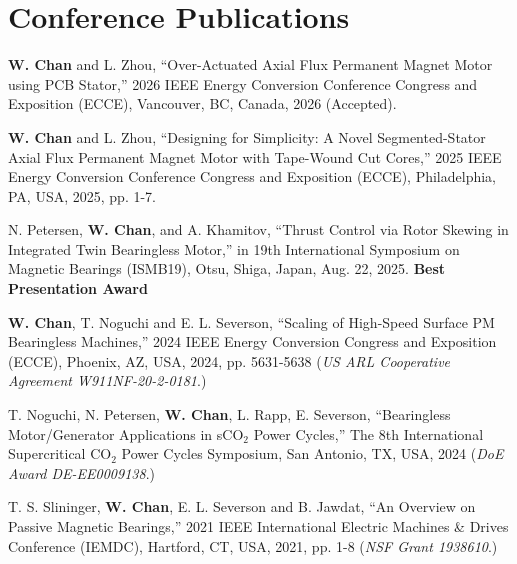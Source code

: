 \section{\sc Conference Publications}

\begin{description}[font=\normalfont, labelwidth=1.5em, leftmargin=2em, itemsep=0.5em]

\item[C6] \textbf{W. Chan} and L. Zhou, ``Over-Actuated Axial Flux Permanent Magnet
Motor using PCB Stator,'' 2026 IEEE Energy Conversion Conference Congress and Exposition (ECCE), Vancouver, BC, Canada, 2026 (Accepted).

\item[C5] \textbf{W. Chan} and L. Zhou, ``Designing for Simplicity: A Novel Segmented-Stator Axial Flux Permanent Magnet Motor with Tape-Wound Cut Cores,'' 2025 IEEE Energy Conversion Conference Congress and Exposition (ECCE), Philadelphia, PA, USA, 2025, pp. 1-7.

\item[C4] N. Petersen, \textbf{W. Chan}, and A. Khamitov, ``Thrust Control via Rotor Skewing in Integrated Twin Bearingless Motor,'' in 19th International Symposium on Magnetic Bearings (ISMB19), Otsu, Shiga, Japan, Aug. 22, 2025. {\color{maroon} \textbf{Best Presentation Award}} 

\item[C3] \textbf{W. Chan}, T. Noguchi and E. L. Severson, ``Scaling of High-Speed Surface PM Bearingless Machines,'' 2024 IEEE Energy Conversion Congress and Exposition (ECCE), Phoenix, AZ, USA, 2024, pp. 5631-5638 (\textit{US ARL Cooperative Agreement W911NF-20-2-0181}.)

\item[C2] T. Noguchi, N. Petersen, \textbf{W. Chan}, L. Rapp, E. Severson, ``Bearingless Motor/Generator Applications in sCO$_2$ Power Cycles,'' The 8th International Supercritical CO$_2$ Power Cycles Symposium, San Antonio, TX, USA, 2024 (\textit{DoE Award DE-EE0009138}.)

\item[C1] T. S. Slininger, \textbf{W. Chan}, E. L. Severson and B. Jawdat, ``An Overview on Passive Magnetic Bearings,'' 2021 IEEE International Electric Machines \& Drives Conference (IEMDC), Hartford, CT, USA, 2021, pp. 1-8 (\textit{NSF Grant 1938610}.)

\end{description}

\endinput
